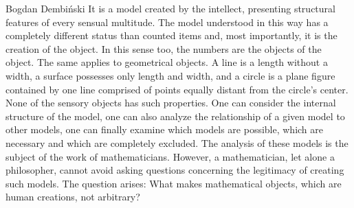 \begin{artengenv}{Bogdan Dembiński}
It is a model created by the intellect, presenting structural features of every sensual multitude. The model understood
in this way has a completely different status than counted items and, most importantly, it is the creation of the
object. In this sense too, the numbers are the objects of the object. The same applies to geometrical objects. A line
is a length without a width, a surface possesses only length and width, and a circle is a plane figure contained by one
line comprised of points equally distant from the circle’s center. None of the sensory objects has such properties. One
can consider the internal structure of the model, one can also analyze the relationship of a given model to other
models, one can finally examine which models are possible, which are necessary and which are completely excluded. The
analysis of these models is the subject of the work of mathematicians. However, a mathematician, let alone a
philosopher, cannot avoid asking questions concerning the legitimacy of creating such models. The question arises: What
makes mathematical objects, which are human creations, not arbitrary?


\end{artengenv}
